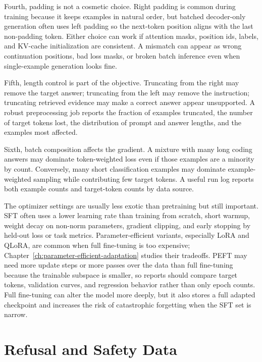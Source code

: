 Fourth, padding is not a cosmetic choice. Right padding is common during training because it keeps examples in natural order, but batched decoder-only generation often uses left padding so the next-token position aligns with the last non-padding token. Either choice can work if attention masks, position ids, labels, and KV-cache initialization are consistent. A mismatch can appear as wrong continuation positions, bad loss masks, or broken batch inference even when single-example generation looks fine.

Fifth, length control is part of the objective. Truncating from the right may remove the target answer; truncating from the left may remove the instruction; truncating retrieved evidence may make a correct answer appear unsupported. A robust preprocessing job reports the fraction of examples truncated, the number of target tokens lost, the distribution of prompt and answer lengths, and the examples most affected.

Sixth, batch composition affects the gradient. A mixture with many long coding answers may dominate token-weighted loss even if those examples are a minority by count. Conversely, many short classification examples may dominate example-weighted sampling while contributing few target tokens. A useful run log reports both example counts and target-token counts by data source.

The optimizer settings are usually less exotic than pretraining but still important. SFT often uses a lower learning rate than training from scratch, short warmup, weight decay on non-norm parameters, gradient clipping, and early stopping by held-out loss or task metrics. Parameter-efficient variants, especially LoRA and QLoRA, are common when full fine-tuning is too expensive; Chapter~\ref{ch:parameter-efficient-adaptation} studies their tradeoffs. PEFT may need more update steps or more passes over the data than full fine-tuning because the trainable subspace is smaller, so reports should compare target tokens, validation curves, and regression behavior rather than only epoch counts. Full fine-tuning can alter the model more deeply, but it also stores a full adapted checkpoint and increases the risk of catastrophic forgetting when the SFT set is narrow.

\section{Refusal and Safety Data}
\label{sec:sft-refusal-safety}

